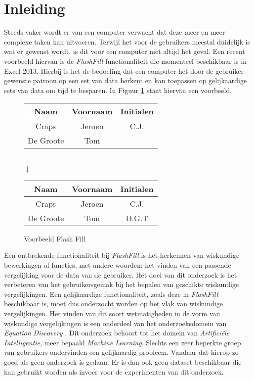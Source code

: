 \documentclass[Main.tex]{subfiles}
\begin{document}
\section{Inleiding}
Steeds vaker wordt er van een computer verwacht dat deze meer en meer complexe taken kan uitvoeren. Terwijl het voor de gebruikers meestal duidelijk is wat er gewenst wordt, is dit voor een computer niet altijd het geval. Een recent voorbeeld hiervan is de \textit{FlashFill} \cite{flashFill} functionaliteit die momenteel beschikbaar is in Excel 2013. Hierbij is het de bedoeling dat een computer het door de gebruiker gewenste patroon op een set van data herkent en kan toepassen op gelijkaardige sets van data om tijd te besparen. In Figuur \ref{fig:flashfill} staat hiervan een voorbeeld.

\begin{figure}[!htb]
\centering
\begin{framed}
\begin{tabular}{| c | c | c |}
\hline
Naam & Voornaam & Initialen \\ \hline
Craps & Jeroen & C.J. \\ \hline
De Groote & Tom &  \\ \hline
\end{tabular} \\
$\downarrow$ \\
\begin{tabular}{| c | c | c |}
\hline
Naam & Voornaam & Initialen \\ \hline
Craps & Jeroen & C.J. \\ \hline
De Groote & Tom &  D.G.T \\ \hline
\end{tabular}
\end{framed}
\caption{Voorbeeld Flash Fill}
\label{fig:flashfill}
\end{figure}

\par Een ontbrekende functionaliteit bij \textit{FlashFill} is het herkennen van wiskundige bewerkingen of functies, met andere woorden: het vinden van een passende vergelijking voor de data van de gebruiker. Het doel van dit onderzoek is het verbeteren van het gebruikersgemak bij het bepalen van geschikte wiskundige vergelijkingen. Een gelijkaardige functionaliteit, zoals deze in \textit{FlashFill}  beschikbaar is, moet dus onderzocht worden op het vlak van wiskundige vergelijkingen. Het vinden van dit soort wetmatigheden in de vorm van wiskundige vergelijkingen is een onderdeel van het onderzoeksdomein van \textit{Equation Discovery} \cite{equationDisc}. Dit onderzoek behoort tot het domein van \textit{Artifici\"ele Intelligentie}, meer bepaald \textit{Machine Learning}. Slechts een zeer beperkte groep van gebruikers ondervinden een gelijkaardig probleem. Vandaar dat hierop zo goed als geen onderzoek is gedaan. Er is dan ook geen dataset beschikbaar die kan gebruikt worden als invoer voor de experimenten van dit onderzoek.  \par
\end{document}
